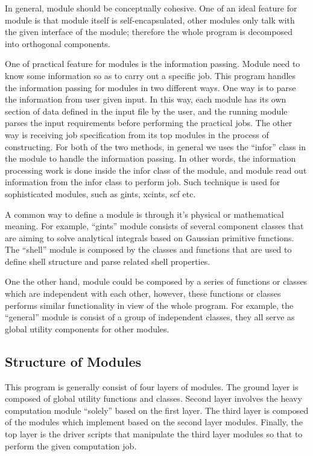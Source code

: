 In general, module should be conceptually cohesive. One of an ideal feature 
for module is that module itself is self-encapsulated, other modules
only talk with the given interface of the module; therefore the whole program
is decomposed into orthogonal components.   

One of practical feature for modules is the information passing. Module need to
know some information so as to carry out a specific job. This program handles
the information passing for modules in two different ways. One way is to parse
the information from user given input. In this way, each module has its own
section of data defined in the input file by the user, and the running module
parses the input requirements before performing the practical jobs. The other
way is receiving job specification from its top modules in the process of
constructing.  For both of the two methods, in general we uses the ``infor''
class in the module to handle the information passing. In other words, the
information processing work is done inside the infor class of the module,
and module read out information from the infor class to perform job. Such 
technique is used for sophisticated modules, such as gints, xcints, scf etc.

A common way to define a module is through it's physical or mathematical
meaning. For example, ``gints'' module consists of several component classes 
that are aiming to solve analytical integrals based on Gaussian primitive
functions. The ``shell'' module is composed by the classes and functions
that are used to define shell structure and parse related shell properties.

One the other hand, module could be composed by a series of functions or
classes which are independent with each other, however, these functions or
classes performs similar functionality in view of the whole program. For
example, the ``general'' module is consist of a group of independent classes,
they all serve as global utility components for other modules.

\subsection{Structure of Modules}
%
%
%
This program is generally consist of four layers of modules. The ground layer
is composed of global utility functions and classes. Second layer involves 
the heavy computation module ``solely'' based on the first layer. The third
layer is composed of the modules which implement based on the second layer
modules. Finally, the top layer is the driver scripts that manipulate the third 
layer modules so that to perform the given computation job.

